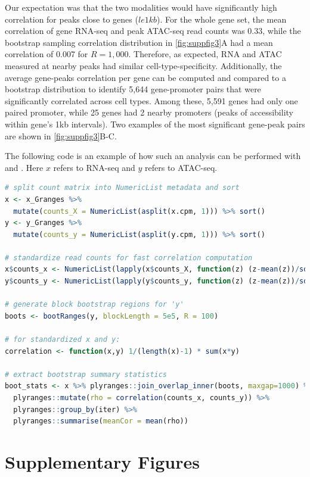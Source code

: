 \documentclass{article}
\begin{document}
Our expectation was that the two modalities would have
significantly high correlation for peaks close to genes ($le 1kb$).
For the whole gene set, the mean
correlation of gene RNA-seq and peak ATAC-seq read counts was 0.33, while the
bootstrap sampling correlation distribution in \cref{fig:suppfig3}A
had a mean correlation of 0.007 for $R = 1,000$.
Therefore, as expected, RNA and ATAC
measured at nearby peaks had similar cell-type-specificity.
Additionally, the average gene-peaks correlation per gene can be
computed and compared to a bootstrap distribution to identify 5,644
gene-promoter pairs that were significantly correlated across cell
types. Among these, 5,591 genes had only one paired promoter, while 25
genes had 2 nearby promoters (peaks of accessibility within gene's 1kb intervals). 
Two examples of the most significant gene-peak pairs are shown in
\cref{fig:suppfig3}B-C.

The following code is an example of how such an analysis can be
performed with \bootranges and \plyranges. Here $x$ refers to RNA-seq and $y$ refers to ATAC-seq.

\begin{lstlisting}[language=R]
# split count matrix into NumericList metadata and sort
x <- x_Granges %>%
  mutate(counts_X = NumericList(asplit(x.cpm, 1))) %>% sort()
y <- y_Granges %>%
  mutate(counts_y = NumericList(asplit(y.cpm, 1))) %>% sort()

# standardize read counts for fast correlation computation
x$counts_x <- NumericList(lapply(x$counts_X, function(z) (z-mean(z))/sd(z)))
y$counts_y <- NumericList(lapply(y$counts_y, function(z) (z-mean(z))/sd(z)))

# generate block bootstrap regions for 'y'
boots <- bootRanges(y, blockLength = 5e5, R = 100)

# for standardized x and y:
correlation <- function(x,y) 1/(length(x)-1) * sum(x*y)

# extract bootstrap summary statistics
boot_stats <- x %>% plyranges::join_overlap_inner(boots, maxgap=1000) %>%
  plyranges::mutate(rho = correlation(counts_x, counts_y)) %>%
  plyranges::group_by(iter) %>%
  plyranges::summarise(meanCor = mean(rho)) 
\end{lstlisting} 
 
\newpage

\section{Supplementary Figures}
\end{document}
